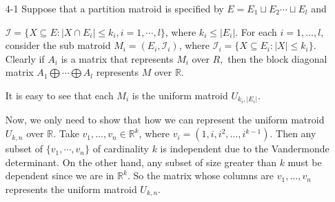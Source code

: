 \documentclass[12pt]{article}
\begin{document}
\begin{enumerate}
\begin{enumerate}
\end{enumerate}

\iffalse
\item[4-1]
Suppose that a partition matroid is specified by $E=E_1\sqcup E_2
\cdots \sqcup E_l$ and

$\mathcal{I} = \{X \subseteq E: |X\cap E_i|\leq k_i ,  i=1,\cdots,l\}$,
where $k_i \leq |E_i|.$ For each $i=1,\ldots,l ,$ consider the sub
matroid  $M_i=(E_i,{\mathcal{I}}_i )$, where ${\mathcal{I}}_i=\{X\subseteq E_i
: |X|\leq k_i\}.$ Clearly if $A_i$ is a matrix that represents $M_i$
over $R,$ then the block diagonal matrix $A_1\bigoplus \cdots
\bigoplus A_l$ represents $M$ over $\mathbb{R}.$

It is easy to see that each $M_i$ is the uniform matroid
$U_{k_i,|E_i|}$.

Now, we only need to show that how we can represent the uniform
matroid $U_{k,n}$ over $\mathbb{R}.$ Take $v_1,\ldots,v_n \in
{\mathbb{R}}^{k}$, where $v_i=(1,i,i^{2},\ldots,i^{k-1}).$ Then any
subset of $\{v_1,\cdots,v_n\}$ of cardinality $k$ is independent due
to the Vandermonde determinant. On the other hand, any subset of
size greater than $k$ must be dependent since we are in
${\mathbb{R}}^{k}.$ So the matrix whose columns are $v_1,\ldots,v_n$
represents the uniform matroid $U_{k,n}.$


\end{enumerate}
\end{document}
